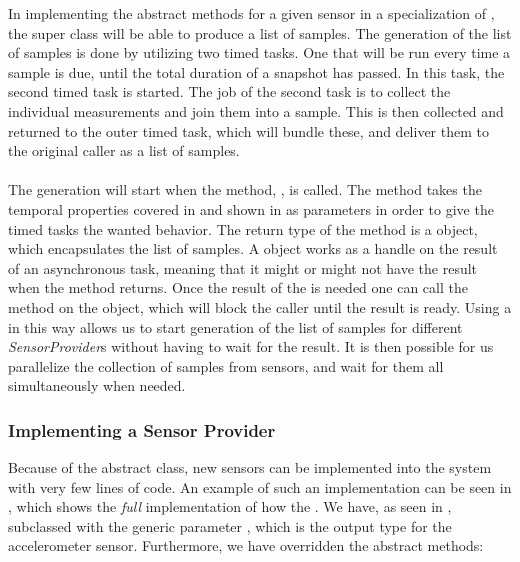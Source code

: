 In implementing the abstract methods for a given sensor in a specialization of , the super class will be able to produce a list of samples. The generation of the list of samples is done by utilizing two timed tasks. One that will be run every time a sample is due, until the total duration of a snapshot has passed. In this task, the second timed task is started. The job of the second task is to collect the individual measurements and join them into a sample. This is then collected and returned to the outer timed task, which will bundle these, and deliver them to the original caller as a list of samples. 
\\\\
The generation will start when the method, , is called. The method takes the temporal properties covered in  and shown in  as parameters in order to give the timed tasks the wanted behavior. The return type of the method is a  object, which encapsulates the list of samples. A  object works as a handle on the result of an asynchronous task, meaning that it might or might not have the result when the method returns. Once the result of the  is needed one can call the  method on the object, which will block the caller until the result is ready. Using a  in this way allows us to start generation of the list of samples for different \emph{SensorProvider}s without having to wait for the result. It is then possible for us parallelize the collection of samples from sensors, and wait for them all simultaneously when needed. %

\subsubsection{Implementing a Sensor Provider}
Because of the abstract  class, new sensors can be implemented into the system with very few lines of code. An example of such an implementation can be seen in , which shows the \emph{full} implementation of how the . We have, as seen in , subclassed  with the generic parameter , which is the output type for the accelerometer sensor. Furthermore, we have overridden the abstract methods: 

